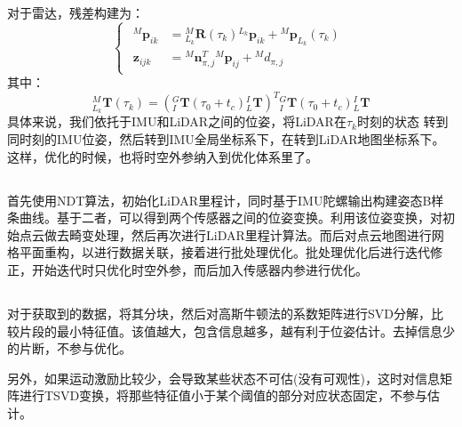 \documentclass[12pt, twocolumn]{article}
\newcommand{\normf}{\kaishu}
\begin{document}
	对于雷达，残差构建为：
	\begin{equation*}
		\begin{cases}
					\begin{aligned}
				{^{M}\boldsymbol{p}_{ik}}&={^{M}_{L_k}\boldsymbol{R}(\tau_k)}{^{L_k}\boldsymbol{p}_{ik}}+{^{M}\boldsymbol{p}_{L_k}(\tau_k)}\\
				\boldsymbol{z}_{ijk}&={^{M}\boldsymbol{n}_{\pi,j}^T}{^{M}\boldsymbol{p}_{ij}}+{^{M}d_{\pi,j}}
			\end{aligned}
		\end{cases}
	\end{equation*}
	其中：
	\begin{equation*}
		{^{M}_{L_k}\boldsymbol{T}(\tau_k)}=\left( {^{G}_{I}\boldsymbol{T}(\tau_0+t_c){^{I}_{L}\boldsymbol{T}}} \right)^T {^{G}_{I}\boldsymbol{T}(\tau_0+t_c){^{I}_{L}\boldsymbol{T}}} 
	\end{equation*}
	具体来说，我们依托于IMU和LiDAR之间的位姿，将LiDAR在$\tau_k$时刻的状态 转到同时刻的IMU位姿，然后转到IMU全局坐标系下，在转到LiDAR地图坐标系下。这样，优化的时候，也将时空外参纳入到优化体系里了。
	\subsection{\normf{整体流程}}
	首先使用NDT算法，初始化LiDAR里程计，同时基于IMU陀螺输出构建姿态B样条曲线。基于二者，可以得到两个传感器之间的位姿变换。利用该位姿变换，对初始点云做去畸变处理，然后再次进行LiDAR里程计算法。而后对点云地图进行网格平面重构，以进行数据关联，接着进行批处理优化。批处理优化后进行迭代修正，开始迭代时只优化时空外参，而后加入传感器内参进行优化。
	\subsection{\normf{可观性}}
	对于获取到的数据，将其分块，然后对高斯牛顿法的系数矩阵进行SVD分解，比较片段的最小特征值。该值越大，包含信息越多，越有利于位姿估计。去掉信息少的片断，不参与优化。
	
	另外，如果运动激励比较少，会导致某些状态不可估(没有可观性)，这时对信息矩阵进行TSVD变换，将那些特征值小于某个阈值的部分对应状态固定，不参与估计。
	
	
	
	
	
	
	
	
\end{document}
